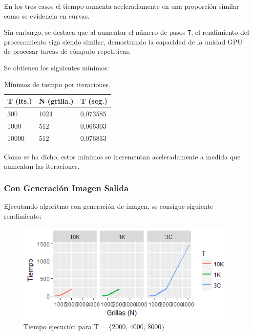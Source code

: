 \documentclass[jou]{apa6}
\begin{document}
En los tres casos el tiempo aumenta aceleradamente en una proporción similar como se evidencia en curvas. 

Sin embargo, se destaca que al aumentar el número de pasos \texttt{T}, el rendimiento del procesamiento siga siendo similar, demostrando la capacidad de la unidad GPU de procesar tareas de cómputo repetitivas. 

Se obtienen los siguientes mínimos: 

\begin{table}[h]
\centering
\caption{Mínimos de tiempo por iteraciones.}
\label{my-label}
\begin{tabular}{@{}lll@{}}
\toprule
\multicolumn{1}{c}{T (its.)} & \multicolumn{1}{c}{N (grilla.)} & \multicolumn{1}{c}{T (seg.)} \\ \midrule
300                          & 1024                         & 0,073585                     \\
1000                         & 512                          & 0,066303                     \\
10000                        & 512                          & 0,076833                     \\ \bottomrule
\end{tabular}
\end{table}

Como se ha dicho, estos mínimos se incrementan aceleradamente a medida que aumentan las iteraciones.

\subsubsection{Con Generación Imagen Salida}
Ejecutando algoritmo con generación de imagen, se consigue siguiente rendimiento:

\begin{figure}[h]
	\includegraphics[width=\columnwidth]{time-same-block-size-with-raw.png}
	\caption{Tiempo ejecución para T = \{2000, 4000, 8000\}}
	\label{fig:Figure2}
\end{figure}
\end{document}
